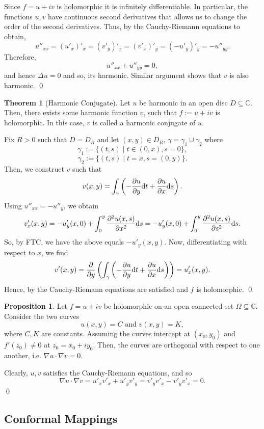 \documentclass[
]{article}
\theoremstyle{definition}
\newtheorem{theorem}{Theorem}
\newtheorem{prop}{Proposition}
\theoremstyle{definition}
\begin{document}
Since \(f = u + iv\) is holomorphic it is infinitely differentiable. In
particular, the functions \(u, v\) have continuous second derivatives
that allows us to change the order of the second derivatives. Thus, by
the Cauchy-Riemann equations to obtain,
\[u''_{xx} = (u'_x)'_x = (v'_y)'_x = (v'_x)'_y = (-u'_y)'_y = -u''_{yy}.\]
Therefore, \[u''_{xx} + u''_{yy} = 0,\] and hence \(\Delta u = 0\) and
so, its harmonic. Similar argument shows that \(v\) is also harmonic.
\qed

\begin{theorem}[Harmonic Conjugate]
  Let \(u\) be harmonic in an open disc \(D \subseteq \mathbb{C}\). Then, there 
  exists some harmonic function \(v\), such that \(f := u + iv\) is holomorphic. 
  In this case, \(v\) is called a harmonic conjugate of \(u\).
\end{theorem}
\proof

Fix \(R > 0\) such that \(D = D_R\) and let \((x, y) \in D_R\),
\(\gamma = \gamma_1 \cup \gamma_2\) where
\[\gamma_1 := \{(t, s) \mid t \in (0, x), s = 0\},\]
\[\gamma_2 := \{(t, s) \mid t = x, s = (0, y)\}.\] Then, we construct
\(v\) such that
\[v(x, y) = \int_\gamma \left( - \pdv{u}{y} \dd t + \pdv{u}{x} \dd s\right).\]
Using \(u''_{xx} = -u''_{y}\), we obtain
\[v'_x(x, y) = - u'_y(x, 0) + \int_0^y \pdv[2]{u(x, s)}{x} \dd s 
    = - u'_y(x, 0) + \int_0^y \pdv[2]{u(x, s)}{s} \dd s.\] So, by FTC,
we have the above equals \(-u'_y(x, y)\). Now, differentiating with
respect to \(x\), we find
\[v'(x, y) = \pdv{y}\left(\int_\gamma \left( - \pdv{u}{y} \dd t + \pdv{u}{x} \dd s\right)\right) 
    = u_x'(x, y).\] Hence, by the Cauchy-Riemann equations are satisfied
and \(f\) is holomorphic. \qed

\begin{prop}
  Let \(f = u + iv\) be holomorphic on an open connected set \(\Omega \subseteq \mathbb{C}\). 
  Consider the two curves
  \[u(x, y) = C \text{ and } v(x, y) = K,\]
  where \(C, K\) are constants. Assuming the curves intercept at \((x_0, y_0)\) 
  and \(f'(z_0) \neq 0\) at \(z_0 = x_0 + iy_0\). Then, the curves are orthogonal 
  with respect to one another, i.e. \(\nabla u \cdot \nabla v = 0\).
\end{prop}
\proof

Clearly, \(u, v\) satisfies the Cauchy-Riemann equations, and so
\[\nabla u \cdot \nabla v = u'_x v'_x + u'_y v'_y = v'_yv'_x - v'_y v'_x = 0.\]
\qed

\hypertarget{conformal-mappings}{%
\subsection{Conformal Mappings}\label{conformal-mappings}}
\end{document}
